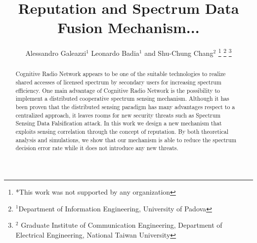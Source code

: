 \documentclass[letterpaper, 10 pt, conference]{ieeeconf}  %
\title{\LARGE \bf
Reputation and Spectrum Data Fusion Mechanism...
}
\author{Alessandro Galeazzi$^{1}$ Leonardo Badia$^{1}$ and Shu-Chung Chang$^{2}$%
\thanks{*This work was not supported by any organization}%
\thanks{$^{1}$Department of Information Engineering, University of Padova}%
\thanks{$^{2}$ Graduate Institute of Communication Engineering, Department of Electrical Engineering, National Taiwan University}%
}
\begin{document}
\maketitle
\thispagestyle{empty}
\pagestyle{empty}


\begin{abstract}
Cognitive Radio Network appears to be one of the suitable technologies to realize shared accesses of licensed spectrum by secondary users for increasing spectrum efficiency. One main advantage of Cognitive Radio Network is the possibility to implement a distributed
cooperative spectrum sensing mechanism.
Although it has been proven that the distributed
sensing paradigm has many advantages respect to a centralized approach, it leaves
rooms for new security threats such as Spectrum Sensing Data Falsification attack. In this work we design a new mechanism that exploits sensing correlation through the concept of reputation. By both theoretical analysis and simulations, we show that our mechanism is able to reduce the spectrum decision error rate while it does not introduce any new threats.
\end{abstract}


\end{document}
